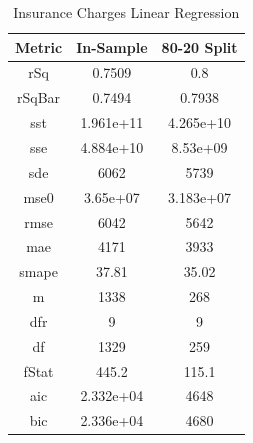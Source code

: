 \documentclass{article}
\begin{document}
\begin{table}[H]
\centering
\caption{Insurance Charges Linear Regression}
\label{tab:Insurance Charges Linear Regression}
\begin{tabular}{|c|c|c|}\hline
Metric & In-Sample & 80-20 Split \\ \hline \hline
rSq & 0.7509 & 0.8 \\ \hline
rSqBar & 0.7494 & 0.7938 \\ \hline
sst & 1.961e+11 & 4.265e+10 \\ \hline
sse & 4.884e+10 & 8.53e+09 \\ \hline
sde & 6062 & 5739 \\ \hline
mse0 & 3.65e+07 & 3.183e+07 \\ \hline
rmse & 6042 & 5642 \\ \hline
mae & 4171 & 3933 \\ \hline
smape & 37.81 & 35.02 \\ \hline
m & 1338 & 268 \\ \hline
dfr & 9 & 9 \\ \hline
df & 1329 & 259 \\ \hline
fStat & 445.2 & 115.1 \\ \hline
aic & 2.332e+04 & 4648 \\ \hline
bic & 2.336e+04 & 4680 \\ \hline
\end{tabular}
\end{table}
\end{document}
